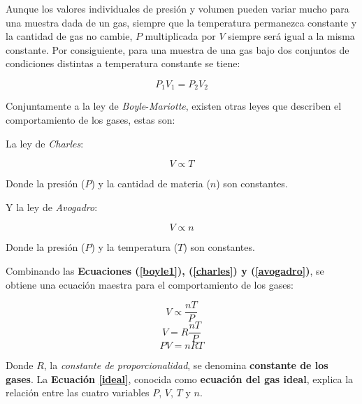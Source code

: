 \documentclass[letter,11pt]{article}
\begin{document}
Aunque los valores individuales de presión y volumen pueden variar mucho para
una muestra dada de un gas, siempre que la temperatura permanezca constante y la
cantidad de gas no cambie, $P$ multiplicada por $V$ siempre será igual a la
misma constante. Por consiguiente, para una muestra de una gas bajo dos
conjuntos de condiciones distintas a temperatura constante se tiene:

\begin{equation}
    P_1 V_1 = P_2 V_2
\label{boyle3}
\end{equation}
\vspace{0.10cm}

Conjuntamente a la ley de \emph{Boyle}-\emph{Mariotte}, existen otras leyes que
describen el comportamiento de los gases, estas son:

La ley de \emph{Charles}:

\begin{equation}
    V \propto T 
\label{charles}
\end{equation}
\vspace{0.10cm}

Donde la presión ($P$) y la cantidad de materia ($n$) son constantes.

Y la ley de \emph{Avogadro}:

\begin{equation}
    V \propto n 
\label{avogadro}
\end{equation}
\vspace{0.10cm}

Donde la presión ($P$) y la temperatura ($T$) son constantes.

Combinando las \textbf{Ecuaciones (\ref{boyle1}), (\ref{charles}) y 
(\ref{avogadro})}, se obtiene una ecuación maestra para el comportamiento de los
gases:

\begin{equation*}
    V \propto \frac{nT}{P}
\end{equation*}
\begin{equation*}
    V = R \frac{nT}{P}
\end{equation*}
\begin{equation}
    PV = nRT
\label{ideal}
\end{equation}
\vspace{0.10cm}

Donde $R$, la \emph{constante de proporcionalidad}, se denomina
\textbf{constante de los gases}. La \textbf{Ecuación \ref{ideal}}, conocida como
\textbf{ecuación del gas ideal}, explica la relación entre las cuatro variables
$P$, $V$, $T$ y $n$.
\end{document}
